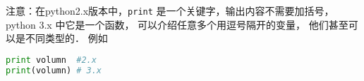 
注意：在python2.x版本中，\verb|print| 是一个关键字，输出内容不需要加括号， python 3.x 中它是一个函数， 可以介绍任意多个用逗号隔开的变量， 他们甚至可以是不同类型的． 例如
\begin{lstlisting}[language=python]
print volumn  #2.x
print(volumn) # 3.x
\end{lstlisting}
